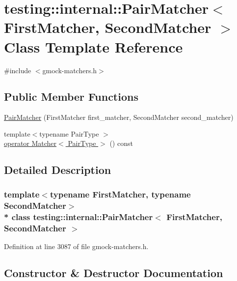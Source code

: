 \hypertarget{classtesting_1_1internal_1_1_pair_matcher}{}\section{testing\+:\+:internal\+:\+:Pair\+Matcher$<$ First\+Matcher, Second\+Matcher $>$ Class Template Reference}
\label{classtesting_1_1internal_1_1_pair_matcher}


{\ttfamily \#include $<$gmock-\/matchers.\+h$>$}

\subsection*{Public Member Functions}
\begin{DoxyCompactItemize}
\item 
\hyperlink{classtesting_1_1internal_1_1_pair_matcher_a84f233a7d90ba33e3f0eb7410783c43c}{Pair\+Matcher} (First\+Matcher first\+\_\+matcher, Second\+Matcher second\+\_\+matcher)
\item 
{\footnotesize template$<$typename Pair\+Type $>$ }\\\hyperlink{classtesting_1_1internal_1_1_pair_matcher_ab8b41dddcbb254e2c8b4374da6423d42}{operator Matcher$<$ Pair\+Type $>$} () const 
\end{DoxyCompactItemize}


\subsection{Detailed Description}
\subsubsection*{template$<$typename First\+Matcher, typename Second\+Matcher$>$\\*
class testing\+::internal\+::\+Pair\+Matcher$<$ First\+Matcher, Second\+Matcher $>$}



Definition at line 3087 of file gmock-\/matchers.\+h.



\subsection{Constructor \& Destructor Documentation}
